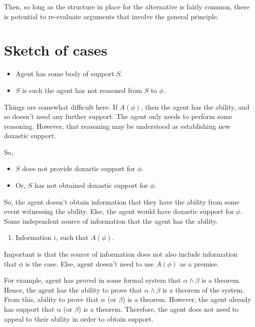 \documentclass[10pt]{article}
\begin{document}
Then, so long as the structure in place for the alternative is fairly common, there is potential to re-evaluate arguments that involve the general principle.

\section{Sketch of cases}
\label{sec:sketch-cases}

\begin{itemize}
\item Agent has some body of support \(S\).
\item \(S\) is such the agent has not reasoned from \(S\) to \(\phi\).
\end{itemize}

Things are somewhat difficult here.
If \(A(\phi)\), then the agent has the ability, and so doesn't need any further support.
The agent only needs to perform some reasoning.
However, that reasoning may be understood as establishing new doxastic support.

So,

\begin{itemize}
\item \(S\) does not provide doxastic support for \(\phi\).
\item Or, \(S\) has not obtained doxastic support for \(\phi\).
\end{itemize}

So, the agent doesn't obtain information that they have the ability from some event witnessing the ability.
Else, the agent would have doxastic support for \(\phi\).
Some independent source of information that the agent has the ability.

\begin{enumerate}
\item\label{abGen:i} Information \(i\), such that \(A(\phi)\).
\end{enumerate}

Important is that the source of information does not also include information that \(\phi\) is the case.
Else, agent doesn't need to use \(A(\phi)\) as a premise.

For example, agent has proved in some formal system that \(\alpha \land \beta\) is a theorem.
Hence, the agent has the ability to prove that \(\alpha \land \beta\) is a theorem of the system.
From this, ability to prove that \(\alpha\) (or \(\beta\)) is a theorem.
However, the agent already has support that \(\alpha\) (or \(\beta\)) is a theorem.
Therefore, the agent does not need to appeal to their ability in order to obtain support.
\end{document}
